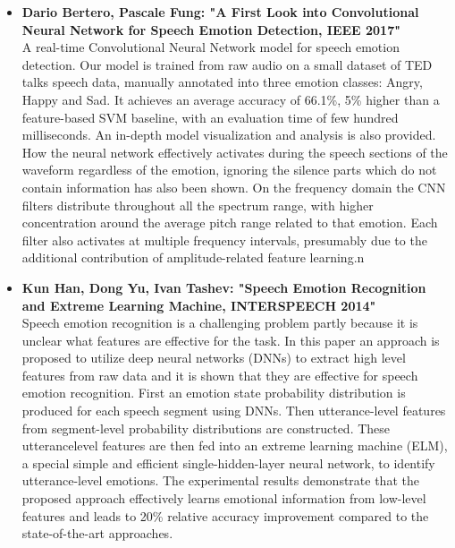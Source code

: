 \documentclass[oneside,a4paper,12pt]{report}
\begin{document}
\begin{normalsize}
\begin{itemize}
	\item \textbf{Dario Bertero, Pascale Fung:  "A First Look into Convolutional Neural Network for Speech Emotion Detection,  IEEE 2017"} \cite{bertero17_convol_neural_networ} \\
	A real-time Convolutional Neural Network model for speech emotion detection. Our model is trained from raw audio on a small dataset of TED talks speech data, manually annotated into three emotion classes: Angry, Happy and Sad. It achieves an average accuracy of 66.1\%, 5\% higher than a feature-based SVM baseline, with an evaluation time of few hundred milliseconds. An in-depth model visualization and analysis is also provided.  How the neural network effectively activates during the speech sections of the waveform regardless of the emotion, ignoring the silence parts which do not contain information has also been shown. On the frequency domain the CNN filters distribute throughout all the spectrum range, with higher concentration around the average pitch range related to that emotion. Each filter also activates at multiple frequency intervals, presumably due to the additional contribution of amplitude-related feature learning.n
		\vspace{5mm}
	\item \textbf{Kun Han, Dong Yu, Ivan Tashev:  "Speech Emotion Recognition and Extreme Learning Machine, INTERSPEECH 2014"} \cite{han14_speec_emotion_recog_using_deep} \\
	Speech emotion recognition is a challenging problem partly because it is unclear what features are effective for the task. In this paper an approach is proposed to utilize deep neural networks (DNNs) to extract high level features from raw data and it is shown that they are effective for speech emotion recognition. First an emotion state probability distribution is produced for each speech segment using DNNs. Then utterance-level features from segment-level probability distributions are constructed. These utterancelevel features are then fed into an extreme learning machine (ELM), a special simple and efficient single-hidden-layer neural network, to identify utterance-level emotions. The experimental results demonstrate  that the proposed approach effectively learns emotional information from low-level features and leads to 20\% relative accuracy improvement compared to the state-of-the-art approaches.
	

\end{itemize}
\end{normalsize}
\end{document}

